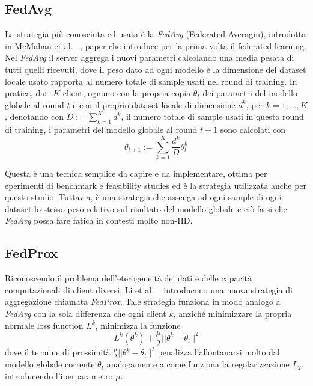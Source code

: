 \subsection{FedAvg}
La strategia più conosciuta ed usata è la \textit{FedAvg} (Federated
Averagin), introdotta in McMahan et al. ~\cite{McMahan2016CommunicationEfficientLO},
paper che introduce per la prima volta il federated learning. Nel 
\textit{FedAvg} il server aggrega i nuovi parametri calcolando una 
media pesata di tutti quelli ricevuti, dove il peso dato ad ogni modello
è la dimensione del dataset locale usato rapporta al numero totale di 
sample usati nel round di training. In pratica, dati \(K\) client,
ognuno con la propria copia \(\theta_t\) dei parametri del modello globale 
al round \(t\) e con il proprio dataset locale di dimensione 
\(d^k\), per \(k = 1, \dots, K\), denotando con 
\(D := \sum_{k=1}^{K} d^k\), il numero totale di sample usati in
questo round di training, i parametri del modello globale al round 
\(t+1\) sono calcolati con 
\[
\theta_{t+1} := \sum_{k=1}^{K} \frac{d^k}{D} \theta_t^k
\]

Questa è una tecnica semplice da capire e da implementare, ottima per 
eperimenti di benchmark e feasibility studies ed è la strategia 
utilizzata anche per questo studio. Tuttavia, è una strategia che 
assenga ad ogni sample di ogni dataset lo stesso peso relativo sul 
risultato del modello globale e ciò fa si che \textit{FedAvg} possa 
fare fatica in contesti molto non-IID.


\subsection{FedProx}
Riconoscendo il problema dell'eterogeneità dei dati e delle capacità 
computazionali di client diversi, Li et al. ~\cite{li2018FederatedOI}
introducono una nuova strategia di aggregazione chiamata 
\textit{FedProx}. Tale strategia funziona in modo analogo a 
\textit{FedAvg} con la sola differenza che ogni client \(k\), anziché 
minimizzare la propria normale loss function \(L^k\), minimizza la 
funzione
\[
L^k(\theta^k) + \frac{\mu}{2} ||\theta^k - \theta_t||^2
\]
dove il termine di prossimità \(\frac{\mu}{2} ||\theta^k - \theta_t||^2\) 
penalizza l'allontanarsi molto dal modello globale corrente
\(\theta_t\) analogamente a come funziona la regolarizzazione \(L_2\),
introducendo l'iperparametro \(\mu\).

